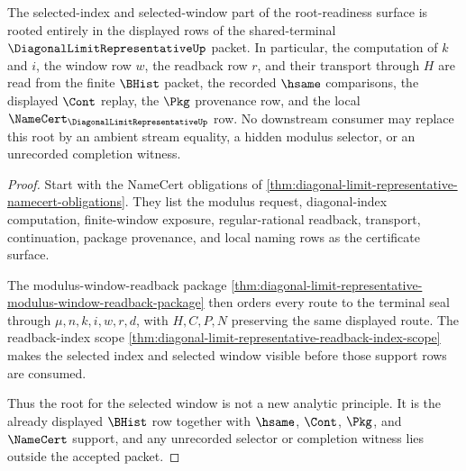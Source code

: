 \begin{theorem}
\label{thm:diagonal-limit-representative-modulus-window-root-unblock}
The selected-index and selected-window part of the root-readiness surface is rooted entirely in the displayed rows of the shared-terminal $\DiagonalLimitRepresentativeUp$ packet. In particular, the computation of $k$ and $i$, the window row $w$, the readback row $r$, and their transport through $H$ are read from the finite $\BHist$ packet, the recorded $\hsame$ comparisons, the displayed $\Cont$ replay, the $\Pkg$ provenance row, and the local $\NameCert_{\DiagonalLimitRepresentativeUp}$ row. No downstream consumer may replace this root by an ambient stream equality, a hidden modulus selector, or an unrecorded completion witness.
\end{theorem}
\begin{proof}
Start with the NameCert obligations of \autoref{thm:diagonal-limit-representative-namecert-obligations}. They list the modulus request, diagonal-index computation, finite-window exposure, regular-rational readback, transport, continuation, package provenance, and local naming rows as the certificate surface.

The modulus-window-readback package \autoref{thm:diagonal-limit-representative-modulus-window-readback-package} then orders every route to the terminal seal through $\mu,n,k,i,w,r,d$, with $H,C,P,N$ preserving the same displayed route. The readback-index scope \autoref{thm:diagonal-limit-representative-readback-index-scope} makes the selected index and selected window visible before those support rows are consumed.

Thus the root for the selected window is not a new analytic principle. It is the already displayed $\BHist$ row together with $\hsame$, $\Cont$, $\Pkg$, and $\NameCert$ support, and any unrecorded selector or completion witness lies outside the accepted packet.
\end{proof}

